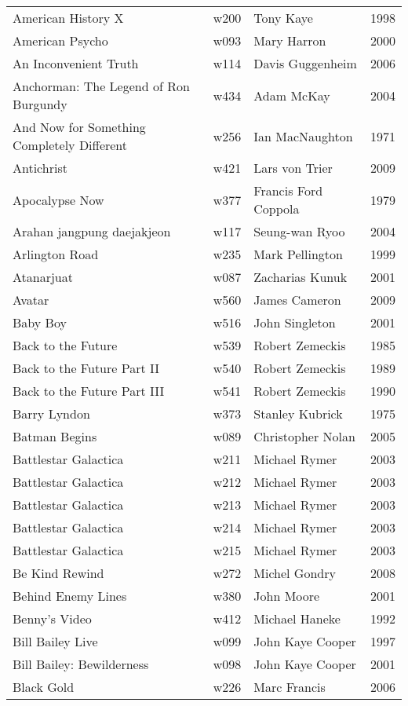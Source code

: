 \documentclass{article}
\begin{document}
\begin {center}
\begin{longtable}{p{10cm} l l l}
American History X & w200 & Tony Kaye & 1998 \\
American Psycho & w093 & Mary Harron & 2000 \\
An Inconvenient Truth & w114 & Davis Guggenheim & 2006 \\
Anchorman: The Legend of Ron Burgundy & w434 & Adam McKay & 2004 \\
And Now for Something Completely Different & w256 & Ian MacNaughton & 1971 \\
Antichrist & w421 & Lars von Trier & 2009 \\
Apocalypse Now & w377 & Francis Ford Coppola & 1979 \\
Arahan jangpung daejakjeon & w117 & Seung-wan Ryoo & 2004 \\
Arlington Road & w235 & Mark Pellington & 1999 \\
Atanarjuat & w087 & Zacharias Kunuk & 2001 \\
Avatar & w560 & James Cameron & 2009 \\
Baby Boy & w516 & John Singleton & 2001 \\
Back to the Future & w539 & Robert Zemeckis & 1985 \\
Back to the Future Part II & w540 & Robert Zemeckis & 1989 \\
Back to the Future Part III & w541 & Robert Zemeckis & 1990 \\
Barry Lyndon & w373 & Stanley Kubrick & 1975 \\
Batman Begins & w089 & Christopher Nolan & 2005 \\
Battlestar Galactica & w211 & Michael Rymer & 2003 \\
Battlestar Galactica & w212 & Michael Rymer & 2003 \\
Battlestar Galactica & w213 & Michael Rymer & 2003 \\
Battlestar Galactica & w214 & Michael Rymer & 2003 \\
Battlestar Galactica & w215 & Michael Rymer & 2003 \\
Be Kind Rewind & w272 & Michel Gondry & 2008 \\
Behind Enemy Lines & w380 & John Moore & 2001 \\
Benny's Video & w412 & Michael Haneke & 1992 \\
Bill Bailey Live & w099 & John Kaye Cooper & 1997 \\
Bill Bailey: Bewilderness & w098 & John Kaye Cooper & 2001 \\
Black Gold & w226 & Marc Francis & 2006 \\

\end{longtable}
\end{center}
\end{document}
